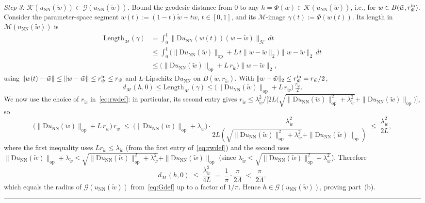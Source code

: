 \documentclass[twoside,11pt]{article}
\newcommand{\BlackBoxProof}{\rule{1.5ex}{1.5ex}}
\renewenvironment{proof}{\par\noindent{\bf Proof\ }}{\hfill\BlackBoxProof\par\medskip}
\newcommand{\D}{\mathrm{D}}
\newcommand{\NN}{\mathrm{NN}}
\newcommand{\calG}{\mathcal{G}}
\newcommand{\calH}{\mathcal{H}}
\newcommand{\calK}{\mathcal{K}}
\newcommand{\calM}{\mathcal{M}}
\begin{document}
\begin{proof}
\emph{Step 3: $\calK(u_\NN(\tilde w)) \subset \calG(u_\NN(\tilde w))$.}
Bound the geodesic distance from $0$ to any $h = \Phi(w) \in \calK(u_\NN(\tilde w))$, i.e., for $w \in B(\tilde w, r^{\rm in}_{\tilde w})$. Consider the parameter-space segment $w(t) := (1-t)\tilde w + tw$, $t \in [0,1]$, and its $\calM$-image $\gamma(t) := \Phi(w(t))$. Its length in $\calM(u_\NN(\tilde w))$ is
\begin{align*}
    \mathrm{Length}_{\calM}(\gamma)
    &= \int_0^1 \|\D u_\NN(w(t))(w-\tilde w)\|_\calH \, dt \\
    &\le \int_0^1 \bigl(\|\D u_\NN(\tilde w)\|_{\mathrm{op}} + L\,t\|w-\tilde w\|_2\bigr) \|w-\tilde w\|_2 \, dt \\
    &\le \bigl(\|\D u_\NN(\tilde w)\|_{\mathrm{op}} + L\,r_{\tilde w}\bigr) \|w-\tilde w\|_2,
\end{align*}
using $\|w(t)-\tilde w\| \le \|w-\tilde w\| \le r^{\rm in}_{\tilde w} \le r_{\tilde w}$ and $L$-Lipschitz $\D u_\NN$ on $B(\tilde w, r_{\tilde w})$. With $\|w-\tilde w\|_2 \le r^{\rm in}_{\tilde w} = r_{\tilde w}/2$,
\[
    d_{\calM}(h, 0) \le \mathrm{Length}_\calM(\gamma) \le \bigl(\|\D u_\NN(\tilde w)\|_{\mathrm{op}} + L\,r_{\tilde w}\bigr)\,\tfrac{r_{\tilde w}}{2}.
\]
We now use the choice of $r_{\tilde w}$ in~\eqref{eq:rwdef}: in particular, its second entry gives
$r_{\tilde w} \le \lambda_{\tilde w}^2/\bigl[2L\bigl(\sqrt{\|\D u_\NN(\tilde w)\|_{\mathrm{op}}^2 + \lambda_{\tilde w}^2} + \|\D u_\NN(\tilde w)\|_{\mathrm{op}}\bigr)\bigr]$, so
\[
    \bigl(\|\D u_\NN(\tilde w)\|_{\mathrm{op}} + L\,r_{\tilde w}\bigr)\,r_{\tilde w}
    \;\le\; \bigl(\|\D u_\NN(\tilde w)\|_{\mathrm{op}} + \lambda_{\tilde w}\bigr) \cdot \frac{\lambda_{\tilde w}^2}{2L(\sqrt{\|\D u_\NN(\tilde w)\|_{\mathrm{op}}^2+\lambda_{\tilde w}^2}+\|\D u_\NN(\tilde w)\|_{\mathrm{op}})}
    \;\le\; \frac{\lambda_{\tilde w}^2}{2L},
\]
where the first inequality uses $L r_{\tilde w} \le \lambda_{\tilde w}$ (from the first entry of~\eqref{eq:rwdef}) and the second uses $\|\D u_\NN(\tilde w)\|_{\mathrm{op}} + \lambda_{\tilde w} \le \sqrt{\|\D u_\NN(\tilde w)\|_{\mathrm{op}}^2 + \lambda_{\tilde w}^2} + \|\D u_\NN(\tilde w)\|_{\mathrm{op}}$ (since $\lambda_{\tilde w} \le \sqrt{\|\D u_\NN(\tilde w)\|_{\mathrm{op}}^2 + \lambda_{\tilde w}^2}$). Therefore
\[
    d_{\calM}(h, 0) \;\le\; \frac{\lambda_{\tilde w}^2}{4L} \;=\; \frac{1}{\pi}\cdot\frac{\pi}{2\Lambda} \;<\; \frac{\pi}{2\Lambda},
\]
which equals the radius of $\calG(u_\NN(\tilde w))$ from~\eqref{eq:Gdef} up to a factor of $1/\pi$. Hence $h \in \calG(u_\NN(\tilde w))$, proving part~(b).
\end{proof}
\end{document}
